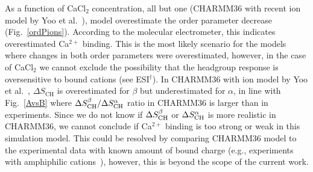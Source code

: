 \documentclass[twoside,twocolumn,9pt]{article}
\begin{document}
As a function of CaCl$_2$ concentration, all but one (CHARMM36 with recent ion model by Yoo et al.~\cite{yoo16}),
model overestimate the order parameter decrease (Fig.~\ref{ordPions}). 
According to the molecular electrometer, this indicates overestimated Ca$^{2+}$ binding. 
This is the most likely scenario for the models where changes in both order parameters were overestimated,
however, in the case of CaCl$_2$ we cannot exclude the possibility that the headgroup response is oversensitive to
bound cations (see ESI$^\dag$).
In CHARMM36 with ion model by Yoo et al.~\cite{yoo16},
$\Delta S_\mathrm{CH}$ is overestimated for $\beta$  but underestimated for  $\alpha$,
in line with Fig.~\ref{AvsB} where $\Delta S_{\rm{CH}}^{\beta}/\Delta S_{\rm{CH}}^{\alpha}$ ratio
in CHARMM36 is larger  than in experiments. Since we do not know if $\Delta S_{\rm{CH}}^{\beta}$ or $\Delta S_{\rm{CH}}^{\alpha}$
is more realistic in CHARMM36, we cannot conclude if Ca$^{2+}$ binding is too strong or weak in this simulation model.
This could be resolved by comparing CHARMM36 model to the experimental data with known amount of bound charge 
(e.g., experiments with amphiphilic cations~\cite{scherer89,franzin98}), however, this is beyond the scope of the
current work. 
\end{document}
